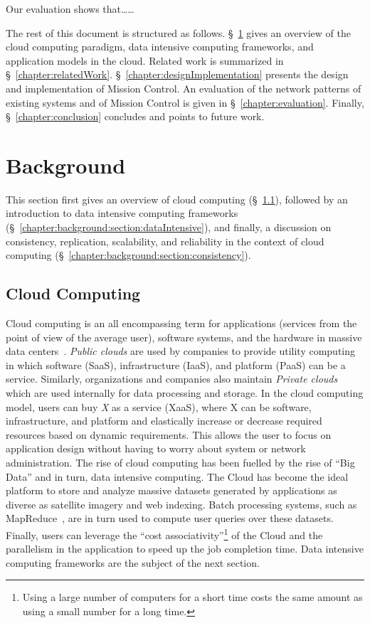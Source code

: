 \documentclass[a4paper,12pt,twoside,openright]{report}
\begin{document}
Our evaluation shows that\ldots\ldots

The rest of this document is structured as follows. \S~\ref{chapter:background}
gives an overview of the cloud computing paradigm, data intensive computing
frameworks, and application models in the cloud. Related work is summarized in
\S~\ref{chapter:relatedWork}.
\S~\ref{chapter:designImplementation} presents the design and implementation of
Mission Control. An evaluation of the network patterns of existing systems and
of Mission Control is given in \S~\ref{chapter:evaluation}. Finally,
\S~\ref{chapter:conclusion} concludes and points to future work.


\chapter{Background}\label{chapter:background}
This section first gives an overview of cloud computing
(\S~\ref{chapter:background:section:cloudComputing}), followed by an
introduction to data intensive computing frameworks
(\S~\ref{chapter:background:section:dataIntensive}), and finally, a discussion
on consistency, replication, scalability, and reliability in the context of
cloud computing (\S~\ref{chapter:background:section:consistency}).

\section{Cloud Computing}\label{chapter:background:section:cloudComputing}
Cloud computing is an all encompassing term for applications (services from the
point of view of the average user), software systems, and the hardware in
massive data centers~\cite{Armbrust:2009:ATC}. \emph{Public clouds} are used by
companies to provide utility computing in which software (SaaS), infrastructure
(IaaS), and platform (PaaS) can be a service. Similarly, organizations and
companies also maintain \emph{Private clouds} which are used internally for data
processing and storage. In the cloud computing model, users can buy \emph{X} as
a service (XaaS), where X can be software, infrastructure, and platform and
elastically increase or decrease required resources based on dynamic
requirements. This allows the user to focus on application design without having
to worry about system or network administration. The rise of cloud computing has
been fuelled by the rise of ``Big Data'' and in turn, data intensive computing.
The Cloud has become the ideal platform to store and analyze massive datasets
generated by applications as diverse as satellite imagery and web indexing.
Batch processing systems, such as MapReduce~\cite{Dean:2004:MSD}, are in turn
used to compute user queries over these datasets. Finally, users can leverage
the ``cost associativity''\footnote{Using a large number of computers for a
short time costs the same amount as using a small number for a long time.} of
the Cloud and the parallelism in the application to speed up the job completion
time. Data intensive computing frameworks are the subject of the next section.
\end{document}
